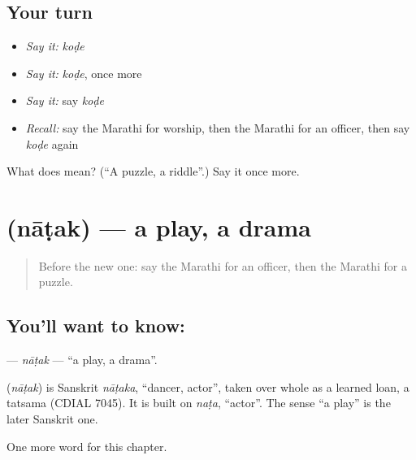\subsection*{Your turn}
\begin{itemize}
\raggedright
  \item \emph{Say it:} \emph{koḍe}
  \item \emph{Say it:} \emph{koḍe}, once more
  \item \emph{Say it:} say \emph{koḍe}
  \item \emph{Recall:} say the Marathi for worship, then the Marathi for an officer, then say \emph{koḍe} again
\end{itemize}

\begin{tcolorbox}[breakable,colback=teal!4,colframe=teal!35!black,title={Before you move on}]
What does  mean? (\textquotedblleft{}A puzzle, a riddle\textquotedblright{}.) Say it once more.
\end{tcolorbox}
\section[\texorpdfstring{\mr{नाटक} (nāṭak)}{नाटक (nāṭak)}]{ (nāṭak) — a play, a drama}

\label{lesson:MR-C275-natak}



\begin{quote}
Before the new one: say the Marathi for an officer, then the Marathi for a puzzle.
\end{quote}

\subsection*{You'll want to know: }
\textbf{} — \emph{nāṭak} — \textquotedblleft{}a play, a drama\textquotedblright{}.

\begin{cousinweb}
\textbf{} (\emph{nāṭak}) is Sanskrit \emph{nāṭaka}, \textquotedblleft{}dancer, actor\textquotedblright{}, taken over whole as a learned loan, a tatsama (CDIAL 7045). It is built on \emph{naṭa}, \textquotedblleft{}actor\textquotedblright{}. The sense \textquotedblleft{}a play\textquotedblright{} is the later Sanskrit one.
\end{cousinweb}

\begin{grammarlens}[title={What you've built}]
One more word for this chapter.
\end{grammarlens}

